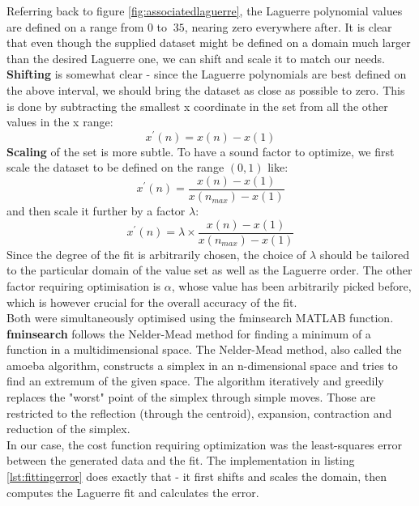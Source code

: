\documentclass[a4paper]{article}
\numberwithin{equation}{section}
\begin{document}
Referring back to figure \ref{fig:associatedlaguerre}, the Laguerre polynomial values are defined on a range from $0$ to $~35$, nearing zero everywhere after. It is clear that even though the supplied dataset might be defined on a domain much larger than the desired Laguerre one, we can shift and scale it to match our needs. \\
\textbf{Shifting} is somewhat clear - since the Laguerre polynomials are best defined on the above interval, we should bring the dataset as close as possible to zero. This is done by subtracting the smallest x coordinate in the set from all the other values in the x range:
\begin{equation}
x^\prime(n) = x(n) - x(1)
\end{equation}
\textbf{Scaling} of the set is more subtle. To have a sound factor to optimize, we first scale the dataset to be defined on the range $(0,1)$ like:
\begin{equation}
x^\prime(n) = \frac{x(n) - x(1)}{x(n_{max}) - x(1)}
\end{equation}
and then scale it further by a factor $\lambda$:
\begin{equation}
x^\prime(n) = \lambda \times \frac{x(n) - x(1)}{x(n_{max}) - x(1)}
\end{equation}
Since the degree of the fit is arbitrarily chosen, the choice of $\lambda$ should be tailored to the particular domain of the value set as well as the Laguerre order. The other factor requiring optimisation is $\alpha$, whose value has been arbitrarily picked before, which is however crucial for the overall accuracy of the fit. \\

\noindent Both were simultaneously optimised using the fminsearch MATLAB function. \textbf{fminsearch} follows the Nelder-Mead method for finding a minimum of a function in a multidimensional space. The Nelder-Mead method, also called the amoeba algorithm, constructs a simplex in an n-dimensional space and tries to find an extremum of the given space. The algorithm iteratively and greedily replaces the "worst" point of the simplex through simple moves. Those are restricted to the reflection (through the centroid), expansion, contraction and reduction of the simplex. \\

\noindent In our case, the cost function requiring optimization was the least-squares error between the generated data and the fit. The implementation in listing \ref{lst:fittingerror} does exactly that - it first shifts and scales the domain, then computes the Laguerre fit and calculates the error.
\end{document}
